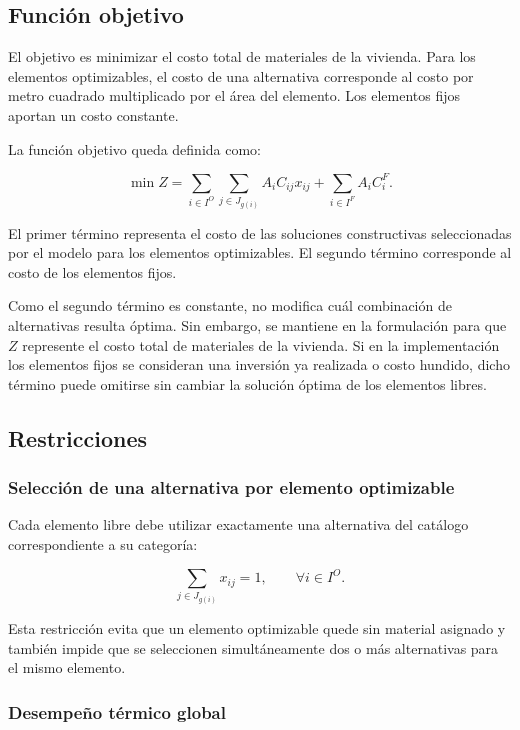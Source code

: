 \documentclass[journal, 12pt, onecolumn]{IEEEtran}
\begin{document}
\subsection{Función objetivo}

El objetivo es minimizar el costo total de materiales de la vivienda. Para los
elementos optimizables, el costo de una alternativa corresponde al costo por
metro cuadrado multiplicado por el área del elemento. Los elementos fijos
aportan un costo constante.

La función objetivo queda definida como:

\[
\min Z =
\sum_{i\in I^{O}}
\sum_{j\in J_{g(i)}}
A_i C_{ij}x_{ij}
+
\sum_{i\in I^{F}}
A_i C_i^{F}.
\]

El primer término representa el costo de las soluciones constructivas
seleccionadas por el modelo para los elementos optimizables. El segundo
término corresponde al costo de los elementos fijos.

Como el segundo término es constante, no modifica cuál combinación de
alternativas resulta óptima. Sin embargo, se mantiene en la formulación para
que $Z$ represente el costo total de materiales de la vivienda. Si en la
implementación los elementos fijos se consideran una inversión ya realizada
o costo hundido, dicho término puede omitirse sin cambiar la solución
óptima de los elementos libres.

\subsection{Restricciones}

\subsubsection{Selección de una alternativa por elemento optimizable}

Cada elemento libre debe utilizar exactamente una alternativa del catálogo
correspondiente a su categoría:

\[
\sum_{j\in J_{g(i)}} x_{ij}=1,
\qquad
\forall i\in I^{O}.
\]

Esta restricción evita que un elemento optimizable quede sin material
asignado y también impide que se seleccionen simultáneamente dos o más
alternativas para el mismo elemento.

\subsubsection{Desempeño térmico global}
\end{document}
